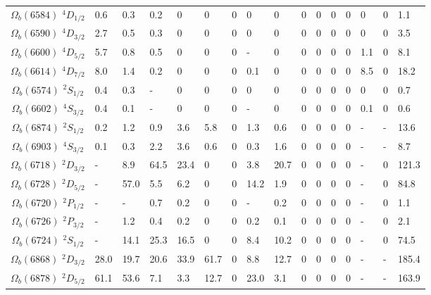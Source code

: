 \begin{tabular}{c |  p{0.58cm}  p{0.58cm}  p{0.58cm}  p{0.58cm}  p{0.58cm}  p{0.58cm}  p{0.58cm}  p{0.58cm}  p{0.58cm}  p{0.58cm}  p{0.58cm}  p{0.58cm}  p{0.58cm}  p{0.58cm}p{0.75cm}}
$\Omega_b(6584)$ $^{4}D_{1/2}$&0.6   &0.3   &0.2   &$0$   &$0$   &$0$   &$0$   &$0$   &$0$   &$0$   &$0$   &$0$   &$0$   &$0$   &1.1  \\
$\Omega_b(6590)$ $^{4}D_{3/2}$&2.7   &0.5   &0.3   &$0$   &$0$   &$0$   &$0$   &$0$   &$0$   &$0$   &$0$   &$0$   &$0$   &$0$   &3.5  \\
$\Omega_b(6600)$ $^{4}D_{5/2}$&5.7   &0.8   &0.5   &$0$   &$0$   &$0$   &-   &$0$   &$0$   &$0$   &$0$   &$0$   &1.1   &$0$   &8.1  \\
$\Omega_b(6614)$ $^{4}D_{7/2}$&8.0   &1.4   &0.2   &$0$   &$0$   &$0$   &0.1   &$0$   &$0$   &$0$   &$0$   &$0$   &8.5   &$0$   &18.2  \\
$\Omega_b(6574)$ $^{2}S_{1/2}$&0.4   &0.3   &-   &$0$   &$0$   &$0$   &$0$   &$0$   &$0$   &$0$   &$0$   &$0$   &$0$   &$0$   &0.7  \\
$\Omega_b(6602)$ $^{4}S_{3/2}$&0.4   &0.1   &-   &$0$   &$0$   &$0$   &-   &$0$   &$0$   &$0$   &$0$   &$0$   &0.1   &$0$   &0.6  \\
$\Omega_b(6874)$ $^{2}S_{1/2}$&0.2   &1.2   &0.9   &3.6   &5.8   &$0$   &1.3   &0.6   &$0$   &$0$   &$0$   &$0$   &-   &-   &13.6  \\
$\Omega_b(6903)$ $^{4}S_{3/2}$&0.1   &0.3   &2.2   &3.6   &0.6   &$0$   &0.3   &1.6   &$0$   &$0$   &$0$   &$0$   &-   &-   &8.7  \\
$\Omega_b(6718)$ $^{2}D_{3/2}$&-   &8.9   &64.5   &23.4   &$0$   &$0$   &3.8   &20.7   &$0$   &$0$   &$0$   &$0$   &-   &$0$   &121.3  \\
$\Omega_b(6728)$ $^{2}D_{5/2}$&-   &57.0   &5.5   &6.2   &$0$   &$0$   &14.2   &1.9   &$0$   &$0$   &$0$   &$0$   &-   &$0$   &84.8  \\
$\Omega_b(6720)$ $^{2}P_{1/2}$&-   &-   &0.7   &0.2   &$0$   &$0$   &-   &0.2   &$0$   &$0$   &$0$   &$0$   &-   &$0$   &1.1  \\
$\Omega_b(6726)$ $^{2}P_{3/2}$&-   &1.2   &0.4   &0.2   &$0$   &$0$   &0.2   &0.1   &$0$   &$0$   &$0$   &$0$   &-   &$0$   &2.1  \\
$\Omega_b(6724)$ $^{2}S_{1/2}$&-   &14.1   &25.3   &16.5   &$0$   &$0$   &8.4   &10.2   &$0$   &$0$   &$0$   &$0$   &-   &$0$   &74.5  \\
$\Omega_b(6868)$ $^{2}D_{3/2}$&28.0   &19.7   &20.6   &33.9   &61.7   &$0$   &8.8   &12.7   &$0$   &$0$   &$0$   &$0$   &-   &-   &185.4  \\
$\Omega_b(6878)$ $^{2}D_{5/2}$&61.1   &53.6   &7.1   &3.3   &12.7   &$0$   &23.0   &3.1   &$0$   &$0$   &$0$   &$0$   &-   &-   &163.9  \\

\end{tabular}
